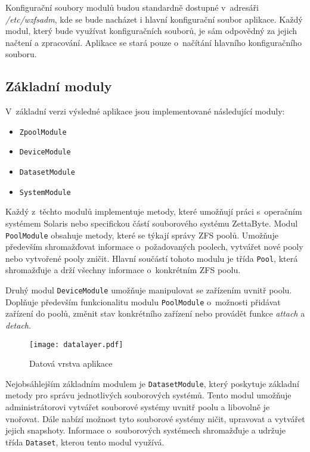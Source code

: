     Konfigurační soubory modulů budou standardně dostupné v~adresáři \emph{/etc/wzfsadm}, kde se bude nacházet i hlavní konfigurační soubor aplikace. Každý modul, který bude využívat konfiguračních souborů, je sám odpovědný za jejich načtení a zpracování. Aplikace se stará pouze o~načítání hlavního konfiguračního souboru.        

    \subsection{Základní moduly}
    V~základní verzi výsledné aplikace jsou implementované následující moduly:
    \begin{itemize}
      \item \verb|ZpoolModule|
      \item \verb|DeviceModule|
      \item \verb|DatasetModule|
      \item \verb|SystemModule|
    \end{itemize}

    Každý z~těchto modulů implementuje metody, které umožňují práci s~operačním systémem Solaris nebo specifickou částí souborového systému ZettaByte. Modul \verb|PoolModule| obsahuje metody, které se týkají správy ZFS poolů. Umožňuje především shromažďovat informace o~požadovaných poolech, vytvářet nové pooly nebo vytvořené pooly zničit. Hlavní součástí tohoto modulu je třída \verb|Pool|, která shromažďuje a drží všechny informace o~konkrétním ZFS poolu.

    Druhý modul \verb|DeviceModule| umožňuje manipulovat se zařízením uvnitř poolu. Doplňuje především funkcionalitu modulu \verb|PoolModule| o~možnosti přidávat zařízení do poolů, změnit stav konkrétního zařízení nebo provádět funkce \emph{attach} a \emph{detach}.
    
    \begin{figure}
        \centering
        \texttt{[image: datalayer.pdf]}
        \caption{Datová vrstva aplikace}
        \label{datalayer}
    \end{figure}

    Nejobsáhlejším základním modulem je \verb|DatasetModule|, který poskytuje základní metody pro správu jednotlivých souborových systémů. Tento modul umožňuje administrátorovi vytvářet souborové systémy uvnitř poolu a libovolně je vnořovat. Dále nabízí možnost tyto souborové systémy ničit, upravovat a vytvářet jejich snapshoty. Informace o~souborových systémech shromažďuje a udržuje třída \verb|Dataset|, kterou tento modul využívá.


